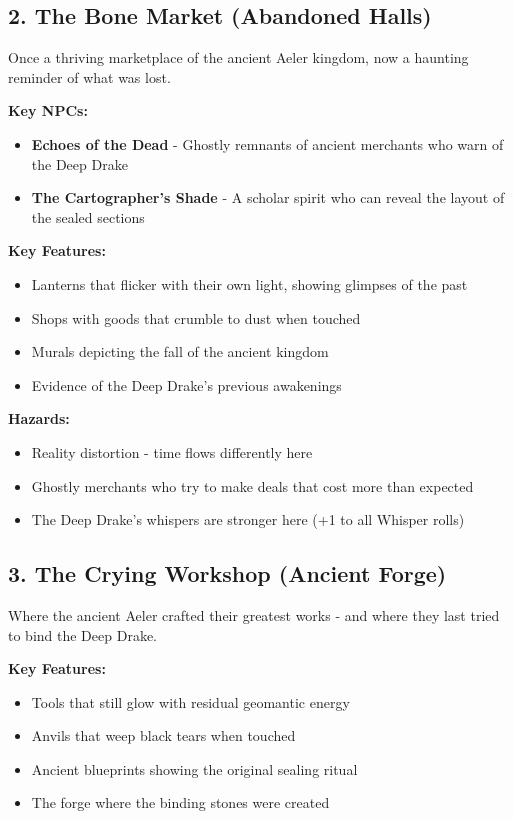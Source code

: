 \documentclass[11pt]{article}
\begin{document}
\subsection{2. The Bone Market (Abandoned Halls)}

Once a thriving marketplace of the ancient Aeler kingdom, now a haunting reminder of what was lost.

\textbf{Key NPCs:}
\begin{itemize}
\item \textbf{Echoes of the Dead} - Ghostly remnants of ancient merchants who warn of the Deep Drake
\item \textbf{The Cartographer's Shade} - A scholar spirit who can reveal the layout of the sealed sections
\end{itemize}

\textbf{Key Features:}
\begin{itemize}
\item Lanterns that flicker with their own light, showing glimpses of the past
\item Shops with goods that crumble to dust when touched
\item Murals depicting the fall of the ancient kingdom
\item Evidence of the Deep Drake's previous awakenings
\end{itemize}

\textbf{Hazards:}
\begin{itemize}
\item Reality distortion - time flows differently here
\item Ghostly merchants who try to make deals that cost more than expected
\item The Deep Drake's whispers are stronger here (+1 to all Whisper rolls)
\end{itemize}

\subsection{3. The Crying Workshop (Ancient Forge)}

Where the ancient Aeler crafted their greatest works - and where they last tried to bind the Deep Drake.

\textbf{Key Features:}
\begin{itemize}
\item Tools that still glow with residual geomantic energy
\item Anvils that weep black tears when touched
\item Ancient blueprints showing the original sealing ritual
\item The forge where the binding stones were created
\end{itemize}
\end{document}
